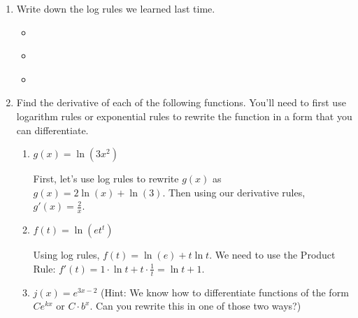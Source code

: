 \documentclass{article}
\begin{document}
\begin{enumerate}[resume]
\item 
  \begin{problem}[1.25in]
    Write down the log rules we learned last time.
  \end{problem}

  \begin{solution}
    \begin{itemize}[topsep=0pt]
  \item {} \

  \item {}\

  \item {}\

  \end{itemize}  
  \end{solution}

\item 

  Find the derivative of each of the following functions. You'll need to first use logarithm rules or exponential rules to rewrite the function in a form that you can differentiate.

  \begin{enumerate}
  \item
    \begin{problem}[\vfill]
      $g(x) = \ln (3x^2)$
    \end{problem}

    \begin{solution}
      First, let's use log rules to rewrite $g(x)$ as 
      $g(x)=2\ln(x)+\ln(3)$. Then using our derivative rules,
      $g'(x)=\boxed{\frac{2}{x}}$.
    \end{solution}

  \item
    \begin{problem}[\vfill]
      $f(t) = \ln \left( e t^t \right)$
    \end{problem}

    \begin{solution}
      Using log rules, $f(t)=\ln(e) + t\ln t$. We need to use the
      Product Rule:
      $f'(t)=1\cdot\ln t + t \cdot \frac{1}{t} =\boxed{\ln t +1}$.
    \end{solution}

  \item
    \begin{problem}[\vfill\newpage]
      $j(x) = e^{3x - 2}$ (Hint: We know how to differentiate functions of the form $C e^{kx}$ or $C \cdot b^x$. Can you rewrite this in one of those two ways?) 
    \end{problem}


\end{enumerate}
\end{enumerate}
\end{document}
